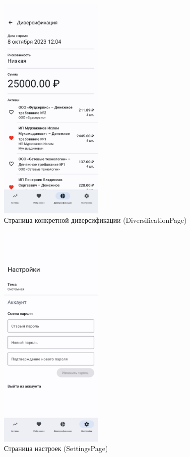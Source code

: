 \documentclass[a4paper, 14pt]{article}
\begin{document}
\begin{figure}[H]
    \centering
    \includegraphics[width=5cm]{resources/12.png}
    \caption{Страница конкретной диверсификации (DiversificationPage)}
\end{figure}

\begin{figure}[H]
    \centering
    \includegraphics[width=5cm]{resources/13.png}
    \caption{Страница настроек (SettingsPage)}
\end{figure}
\end{document}
